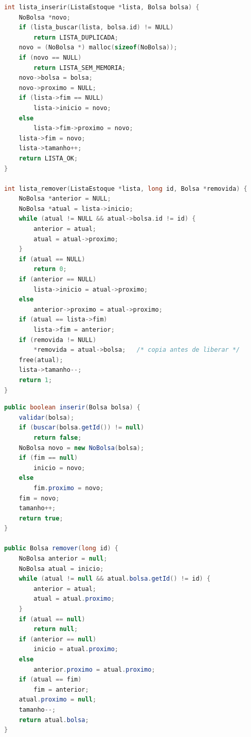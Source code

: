 \documentclass[12pt,a4paper,oneside]{report}
\newcommand{\fonte}[1][Elaborado pelos autores (2026).]{\par\vspace{2pt}{\centering\small Fonte: #1\par}\vspace{6pt}}
\newcommand{\cod}[1]{\texttt{#1}}
\begin{document}
\begin{lstlisting}[language=C,caption={Inserção e remoção na lista do estoque, em C (\cod{lista\_estoque.c})},label=cod:lista-c]
int lista_inserir(ListaEstoque *lista, Bolsa bolsa) {
    NoBolsa *novo;
    if (lista_buscar(lista, bolsa.id) != NULL)
        return LISTA_DUPLICADA;
    novo = (NoBolsa *) malloc(sizeof(NoBolsa));
    if (novo == NULL)
        return LISTA_SEM_MEMORIA;
    novo->bolsa = bolsa;
    novo->proximo = NULL;
    if (lista->fim == NULL)
        lista->inicio = novo;
    else
        lista->fim->proximo = novo;
    lista->fim = novo;
    lista->tamanho++;
    return LISTA_OK;
}

int lista_remover(ListaEstoque *lista, long id, Bolsa *removida) {
    NoBolsa *anterior = NULL;
    NoBolsa *atual = lista->inicio;
    while (atual != NULL && atual->bolsa.id != id) {
        anterior = atual;
        atual = atual->proximo;
    }
    if (atual == NULL)
        return 0;
    if (anterior == NULL)
        lista->inicio = atual->proximo;
    else
        anterior->proximo = atual->proximo;
    if (atual == lista->fim)
        lista->fim = anterior;
    if (removida != NULL)
        *removida = atual->bolsa;   /* copia antes de liberar */
    free(atual);
    lista->tamanho--;
    return 1;
}
\end{lstlisting}
\fonte

\begin{lstlisting}[language=Java,caption={Inserção e remoção na lista do estoque, em Java (\cod{ListaEstoque.java})},label=cod:lista-java]
public boolean inserir(Bolsa bolsa) {
    validar(bolsa);
    if (buscar(bolsa.getId()) != null)
        return false;
    NoBolsa novo = new NoBolsa(bolsa);
    if (fim == null)
        inicio = novo;
    else
        fim.proximo = novo;
    fim = novo;
    tamanho++;
    return true;
}

public Bolsa remover(long id) {
    NoBolsa anterior = null;
    NoBolsa atual = inicio;
    while (atual != null && atual.bolsa.getId() != id) {
        anterior = atual;
        atual = atual.proximo;
    }
    if (atual == null)
        return null;
    if (anterior == null)
        inicio = atual.proximo;
    else
        anterior.proximo = atual.proximo;
    if (atual == fim)
        fim = anterior;
    atual.proximo = null;
    tamanho--;
    return atual.bolsa;
}
\end{lstlisting}
\fonte
\end{document}
